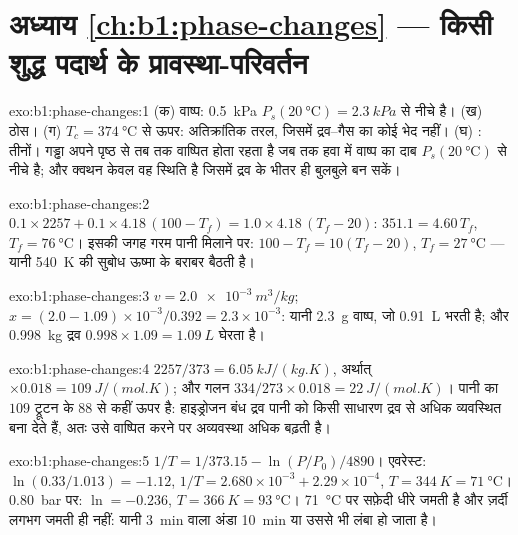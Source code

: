 \section*{अध्याय \ref{ch:b1:phase-changes} --- किसी शुद्ध पदार्थ के प्रावस्था-परिवर्तन}

\begin{solution}{exo:b1:phase-changes:1}
(क) वाष्प: \qty{0.5}{kPa} $P_s(\qty{20}{\degreeCelsius}) = \qty{2.3}{kPa}$ से नीचे है।
(ख) ठोस। (ग) $T_c = \qty{374}{\degreeCelsius}$ से ऊपर: अतिक्रांतिक तरल, जिसमें
द्रव--गैस का कोई भेद नहीं। (घ) : तीनों। गड्ढा अपने पृष्ठ से तब
तक वाष्पित होता रहता है जब तक हवा में वाष्प का दाब
$P_s(\qty{20}{\degreeCelsius})$ से नीचे है; और क्वथन केवल वह स्थिति है जिसमें
द्रव के भीतर ही बुलबुले बन सकें।
\end{solution}

\begin{solution}{exo:b1:phase-changes:2}
$0.1 \times 2257 + 0.1 \times 4.18\,(100 - T_f) = 1.0 \times 4.18\,(T_f - 20)$:
$351.1 = 4.60\,T_f$, $T_f = \qty{76}{\degreeCelsius}$। इसकी जगह गरम पानी
मिलाने पर: $100 - T_f = 10(T_f - 20)$, $T_f = \qty{27}{\degreeCelsius}$ --- यानी
 \qty{540}{K} की सुबोध ऊष्मा के बराबर बैठती है।
\end{solution}

\begin{solution}{exo:b1:phase-changes:3}
$v = \qty{2.0e-3}{m^3/kg}$; $x = (2.0 - 1.09) \times 10^{-3}/0.392 = 2.3 \times 10^{-3}$:
यानी \qty{2.3}{g} वाष्प, जो \qty{0.91}{L} भरती है; और \qty{0.998}{kg} द्रव
$0.998 \times 1.09 = \qty{1.09}{L}$ घेरता है।
\end{solution}

\begin{solution}{exo:b1:phase-changes:4}
$2257/373 = \qty{6.05}{kJ/(kg.K)}$, अर्थात् $\times 0.018 = \qty{109}{J/(mol.K)}$;
और गलन $334/273 \times 0.018 = \qty{22}{J/(mol.K)}$। पानी का $109$ ट्रूटन के
$88$ से कहीं ऊपर है: हाइड्रोजन बंध द्रव पानी को किसी साधारण द्रव से अधिक
व्यवस्थित बना देते हैं, अतः उसे वाष्पित करने पर अव्यवस्था अधिक बढ़ती है।
\end{solution}

\begin{solution}{exo:b1:phase-changes:5}
$1/T = 1/373.15 - \ln(P/P_0)/4890$। एवरेस्ट: $\ln(0.33/1.013) = -1.12$,
$1/T = 2.680 \times 10^{-3} + 2.29 \times 10^{-4}$, $T = \qty{344}{K} =
\qty{71}{\degreeCelsius}$। \qty{0.80}{bar} पर: $\ln = -0.236$, $T = \qty{366}{K} =
\qty{93}{\degreeCelsius}$। \qty{71}{\degreeCelsius} पर सफ़ेदी धीरे जमती है और
ज़र्दी लगभग जमती ही नहीं: यानी \qty{3}{min} वाला अंडा
\qty{10}{min} या उससे भी लंबा हो जाता है।
\end{solution}

